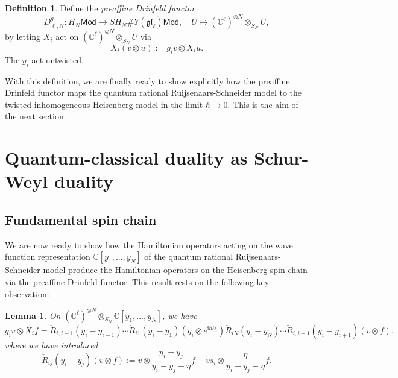 \documentclass[11pt]{report}
\newtheorem{lemma}[theorem]{Lemma}
\theoremstyle{definition}
\newtheorem{definition}[theorem]{Definition}
\theoremstyle{remark}
\theoremstyle{remark}
\newcommand{\C}{\mathbb{C}}
\newcommand{\I}{\mathrm{i}}
\begin{document}
\begin{definition}
Define the \emph{preaffine Drinfeld functor}
\begin{equation*}
D_{\ell,N}^g: \ddot H_N\mathsf{Mod} \to S\ddot H_N \# Y(\mathfrak{gl}_\ell)\mathsf{Mod}, \quad U \mapsto (\C^\ell)^{\otimes N} \otimes_{S_N} U,
\end{equation*}
by letting $X_i$ act on $(\C^\ell)^{\otimes N} \otimes_{S_N} U$ via
\begin{equation*}
X_i(v \otimes u) := g_i v \otimes X_i u.
\end{equation*}
The $y_i$ act untwisted.
\end{definition}

With this definition, we are finally ready to show explicitly how the preaffine Drinfeld functor maps the quantum rational Ruijsenaars-Schneider model to the twisted inhomogeneous Heisenberg model in the limit $\hbar \to 0$. This is the aim of the next section.

\section{Quantum-classical duality as Schur-Weyl duality}

\subsection{Fundamental spin chain}

We are now ready to show how the Hamiltonian operators acting on the wave function representation $\C[y_1,...,y_N]$ of the quantum rational Ruijsenaars-Schneider model produce the Hamiltonian operators on the Heisenberg spin chain via the preaffine Drinfeld functor. This result rests on the following key observation:

\begin{lemma}\label{lemma:keyLemma}
On $(\C^\ell)^{\otimes N} \otimes_{S_N} \C[y_1,...,y_N]$, we have
\begin{equation*}
g_i v \otimes X_i f = \check R_{i,i-1}(y_i-y_{i-1}) \cdots \check R_{i1}(y_i-y_1) (g_i \otimes e^{\I \hbar \partial_i}) \check R_{iN}(y_i-y_N) \cdots \check R_{i,i+1}(y_i-y_{i+1}) (v \otimes f).
\end{equation*}
where we have introduced
\begin{equation*}
\check R_{ij}(y_i-y_j) (v \otimes f) := v \otimes \frac{y_i-y_j}{y_i-y_j-\eta} f - v s_i \otimes \frac{\eta}{y_i-y_j-\eta} f.
\end{equation*}
\end{lemma}
\end{document}
